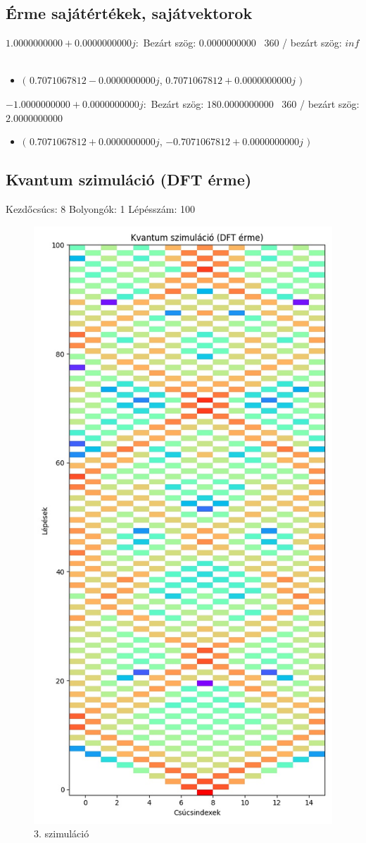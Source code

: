 \documentclass[14pt,a4paper]{article}
\begin{document}
\subsection{Érme sajátértékek, sajátvektorok}
$1.0000000000+0.0000000000j$:\
Bezárt szög: $0.0000000000$ \
360 / bezárt szög: $inf$\
\begin{itemize}
\item
$\big($
$0.7071067812-0.0000000000j$, $0.7071067812+0.0000000000j$
$\big)$
\end{itemize}
$-1.0000000000+0.0000000000j$:\
Bezárt szög: $180.0000000000$ \
360 / bezárt szög: $2.0000000000$\
\begin{itemize}
\item
$\big($
$0.7071067812+0.0000000000j$, $-0.7071067812+0.0000000000j$
$\big)$
\end{itemize}
\subsection{Kvantum szimuláció (DFT érme)}
Kezdőcsúcs: 8
Bolyongók: 1
Lépésszám: 100
\begin{figure}[H]
\centering
\includegraphics[width = 0.7\columnwidth]{sim_03/counts.jpg}
\caption{3. szimuláció}
\end{figure}
\end{document}
